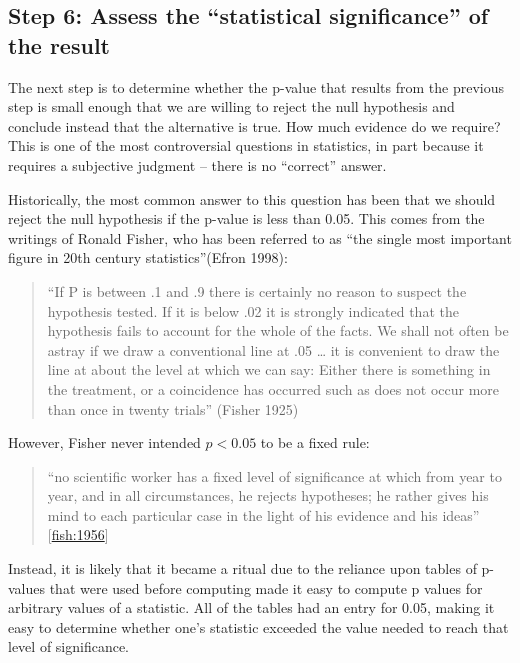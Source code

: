 \documentclass[]{book}
\theoremstyle{definition}
\theoremstyle{definition}
\theoremstyle{definition}
\theoremstyle{remark}
\begin{document}
\subsection{\texorpdfstring{Step 6: Assess the ``statistical
significance'' of the
result}{Step 6: Assess the statistical significance of the result}}\label{step-6-assess-the-statistical-significance-of-the-result}

The next step is to determine whether the p-value that results from the
previous step is small enough that we are willing to reject the null
hypothesis and conclude instead that the alternative is true. How much
evidence do we require? This is one of the most controversial questions
in statistics, in part because it requires a subjective judgment --
there is no ``correct'' answer.

Historically, the most common answer to this question has been that we
should reject the null hypothesis if the p-value is less than 0.05. This
comes from the writings of Ronald Fisher, who has been referred to as
``the single most important figure in 20th century statistics''(Efron
1998):

\begin{quote}
``If P is between .1 and .9 there is certainly no reason to suspect the
hypothesis tested. If it is below .02 it is strongly indicated that the
hypothesis fails to account for the whole of the facts. We shall not
often be astray if we draw a conventional line at .05 \ldots{} it is
convenient to draw the line at about the level at which we can say:
Either there is something in the treatment, or a coincidence has
occurred such as does not occur more than once in twenty trials''
(Fisher 1925)
\end{quote}

However, Fisher never intended \(p < 0.05\) to be a fixed rule:

\begin{quote}
``no scientific worker has a fixed level of significance at which from
year to year, and in all circumstances, he rejects hypotheses; he rather
gives his mind to each particular case in the light of his evidence and
his ideas'' {[}\url{fish:1956}{]}
\end{quote}

Instead, it is likely that it became a ritual due to the reliance upon
tables of p-values that were used before computing made it easy to
compute p values for arbitrary values of a statistic. All of the tables
had an entry for 0.05, making it easy to determine whether one's
statistic exceeded the value needed to reach that level of significance.
\end{document}
